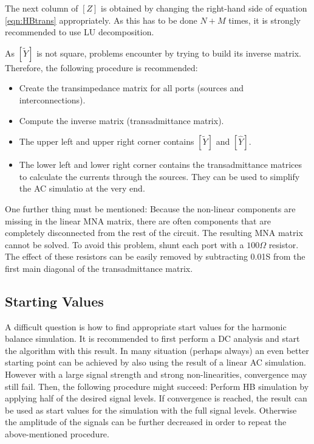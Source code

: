 The next column of $[Z]$ is obtained by changing the right-hand
side of equation \eqref{eqn:HBtrans} appropriately. As this has to
be done $N+M$ times, it is strongly recommended to use LU
decomposition.

\addvspace{12pt}

As $[\tilde{Y}]$ is not square, problems encounter by trying to
build its inverse matrix. Therefore, the following procedure is
recommended:
\begin{itemize}
\item Create the transimpedance matrix for all ports (sources
  and interconnections).
\item Compute the inverse matrix (transadmittance matrix).
\item The upper left and upper right corner contains $[\tilde{Y}]$
  and $[\hat{Y}]$.
\item The lower left and lower right corner contains the transadmittance
  matrices to calculate the currents through the sources. They
  can be used to simplify the AC simulatio at the very end.
\end{itemize}


\addvspace{12pt}

One further thing must be mentioned: Because the non-linear
components are missing in the linear MNA matrix, there are often
components that are completely disconnected from the rest of the
circuit. The resulting MNA matrix cannot be solved. To avoid
this problem, shunt each port with a $100\Omega$ resistor. The
effect of these resistors can be easily removed by subtracting
0.01S from the first main diagonal of the transadmittance matrix.


\subsection{Starting Values}

A difficult question is how to find appropriate start values for the
harmonic balance simulation. It is recommended to first perform a DC
analysis and start the algorithm with this result. In many situation
(perhaps always) an even better starting point can be achieved by
also using the result of a linear AC simulation. However with a large
signal strength and strong non-linearities, convergence may still
fail. Then, the following procedure might succeed: Perform HB
simulation by applying half of the desired signal levels. If convergence
is reached, the result can be used as start values for the simulation
with the full signal levels. Otherwise the amplitude of the signals can
be further decreased in order to repeat the above-mentioned procedure.



